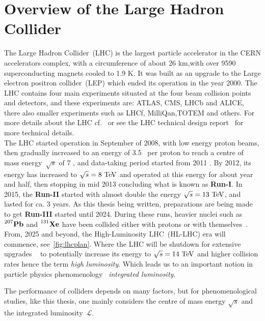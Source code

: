 \section{Overview of the Large Hadron Collider \label{sec:theLHC}}
\par The Large Hadron Collider~(LHC) is the largest particle accelerator in the CERN accelerators complex, with a circumference of about 26 \si{\kilo\metre},with over 9590 superconducting magnets cooled to 1.9 \si{\kelvin}. It was built as an upgrade to the  Large electron positron collider~(LEP) which ended its operation in the year 2000. The LHC contains four main experiments situated at the four beam collision points and detectors, and these experiments are: ATLAS, CMS, LHCb and ALICE, there also smaller experiments such as LHCf, MilliQan,TOTEM and others. For more details about the LHC cf.~\cite{cernfacts,welt-machine} or see the LHC technical design report~\cite{Bruning:2004ej} for more technical details.\\   The LHC started operation in September of 2008, with low energy proton beams, then gradually increased to an energy of 3.5 \TeV\ per proton to reach a centre of mass energy~$\sqrt{s}$ of 7 \TeV, and data-taking period started from 2011 . By 2012, its energy has increased to $\sqrt{s}= 8\ \TeV$ and operated at this energy for about year and half, then stopping in mid 2013 concluding what is known as \textbf{Run-I}. In 2015, the \textbf{Run-II} started with almost double the energy $\sqrt{s}= 13\ \TeV$, and lasted for ca. 3 years. As this thesis being written, preparations are being made to get \textbf{Run-III} started until 2024. During these runs, heavier nuclei such as $\prescript{207}{}{\mathbf{Pb}}$ and $\prescript{131}{}{\mathbf{Xe}}$ have been collided either with protons or with themselves~\cite{lhckomission}.  \\  From, 2025 and beyond, the High-Luminosity LHC~(HL-LHC) era will commence, see~\autoref{fig:lhcplan}.   Where the LHC will be shutdown for extensive upgrades ~\cite{Apollinari:2015bam} to potentially increase its energy to  $\sqrt{s}= 14\ \TeV$ and higher collision rates hence the term \emph{high luminosity}. Which leads us to an important notion in particle physics phenomenology ~\emph{integrated luminosity}.\\
\par The performance of colliders depends on many factors, but for phenomenological studies, like this thesis, one mainly considers the centre of mass energy $\sqrt{s}$ and the integrated luminosity~$\mathscr{L}$.
